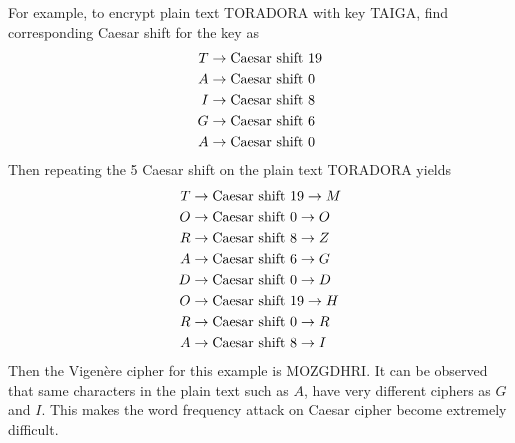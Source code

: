 \documentclass[12pt]{article}
\begin{document}
\begin{enumerate}
	For example, to encrypt plain text TORADORA with key TAIGA, find corresponding Caesar shift for the key as
	\begin{align*}
		T &\rightarrow \textnormal{Caesar shift 19} \\
		A &\rightarrow \textnormal{Caesar shift 0} \\
		I &\rightarrow \textnormal{Caesar shift 8} \\
		G &\rightarrow \textnormal{Caesar shift 6} \\
		A &\rightarrow \textnormal{Caesar shift 0} \\
	\end{align*}
	Then repeating the 5 Caesar shift on the plain text TORADORA yields
	\begin{align*}
		T &\rightarrow \textnormal{Caesar shift 19} \rightarrow M \\
		O &\rightarrow \textnormal{Caesar shift 0} \rightarrow O \\
		R &\rightarrow \textnormal{Caesar shift 8} \rightarrow Z \\
		A &\rightarrow \textnormal{Caesar shift 6} \rightarrow G \\
		D &\rightarrow \textnormal{Caesar shift 0} \rightarrow D \\
		O &\rightarrow \textnormal{Caesar shift 19} \rightarrow H \\
		R &\rightarrow \textnormal{Caesar shift 0} \rightarrow R \\
		A &\rightarrow \textnormal{Caesar shift 8} \rightarrow I \\
	\end{align*}
	Then the Vigenère cipher for this example is MOZGDHRI. It can be observed that same characters in the plain text such as $A$, have very different ciphers as $G$ and $I$. This makes the word frequency attack on Caesar cipher become extremely difficult.
	\begin{table}[h]
		\centering
\end{table}
\end{enumerate}
\end{document}

